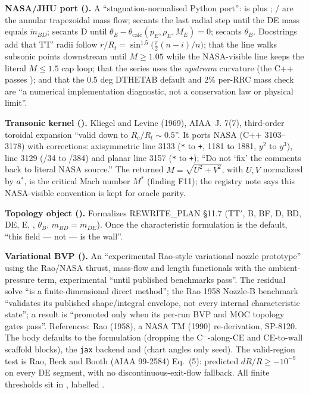\textbf{NASA/JHU port ().} A ``stagnation-normalised Python port'':  is
 plus ; / are
the annular trapezoidal mass flow;  secants the last radial step until the DE mass equals
$\dot m_{BD}$;  secants D until $\theta_E - \theta_{\text{calc}}(p_E,\rho_E,M_E) = 0$;
 secants $\theta_B$. Docstrings add that TT$'$ radii follow
$r/R_t = \sin^{1.5}\bigl(\tfrac{\pi}{2}(n-i)/n\bigr)$; that the  line walks subsonic points
downstream until $M \ge 1.05$ while the NASA-visible line keeps the literal $M \le 1.5$ cap loop; that the series
uses the \emph{upstream} curvature (the C++ passes ); and that the 0.5 deg DTHETAB default and 2\%
per-RRC mass check are ``a numerical implementation diagnostic, not a conservation law or physical limit''.

\textbf{Transonic kernel ().} Kliegel and Levine (1969), AIAA~J. 7(7), third-order
toroidal expansion ``valid down to $R_c/R_t \sim 0.5$''. It ports NASA  (C++ 3103--3178) with
corrections: axisymmetric line 3133 (\texttt{*} to \texttt{+}, 1181 to 1881, $y^2$ to $y^3$), line 3129 (/34 to
/384) and planar line 3157 (\texttt{*} to \texttt{+}); ``Do not `fix' the comments back to literal NASA
source.'' The returned $M = \sqrt{U^2+V^2}$, with $U,V$ normalized by $a^*$, is the critical Mach number $M^*$
(finding F11); the registry note says this NASA-visible convention is kept for oracle parity.

\textbf{Topology object ().} Formalizes REWRITE\_PLAN \S11.7 (TT$'$, B, BF, D, BD, DE, E,
, $\theta_B$, $\dot m_{BD} = \dot m_{DE}$). Once the characteristic formulation is the default,
``this field --- not  --- is the wall''.

\textbf{Variational BVP ().} An ``experimental Rao-style variational nozzle prototype''
using the Rao/NASA thrust, mass-flow and length functionals with the ambient-pressure term, experimental ``until
published benchmarks pass''. The residual solve ``is a finite-dimensional direct method''; the Rao 1958 Nozzle-B
benchmark ``validates its published shape/integral envelope, not every internal characteristic state''; a result
is ``promoted only when its per-run BVP and MOC topology gates pass''. References: Rao (1958), a NASA TM (1990)
re-derivation, SP-8120. The body defaults to the  formulation (dropping the C$^-$-along-CE
and CE-to-wall scaffold blocks), the \texttt{jax} backend and  (chart angles only
seed). The valid-region test is Rao, Beck and Booth (AIAA 99-2584) Eq.~(5): predicted $dR/R \ge -10^{-9}$ on every
DE segment, with no discontinuous-exit-flow fallback. All finite thresholds sit in ,
labelled .

